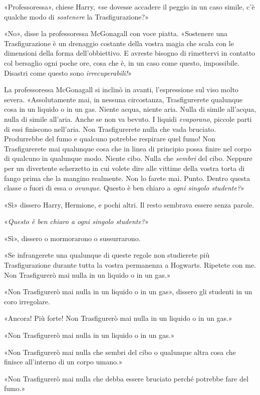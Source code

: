 «Professoressa», chiese Harry, «se dovesse accadere il peggio in un caso simile, c’è qualche modo di \textit{sostenere} la Trasfigurazione?»

«No», disse la professoressa McGonagall con voce piatta. «Sostenere una Trasfigurazione è un drenaggio costante della vostra magia che scala con le dimensioni della forma dell’obbiettivo. E avreste bisogno di rimettervi in contatto col bersaglio ogni poche ore, cosa che è, in un caso come questo, impossibile. Disastri come questo sono \textit{irrecuperabili!}»

La professoressa McGonagall si inclinò in avanti, l’espressione sul viso molto severa. «Assolutamente mai, in nessuna circostanza, Trasfigurerete qualunque cosa in un liquido o in un gas. Niente acqua, niente aria. Nulla di simile all’acqua, nulla di simile all’aria. Anche se non va bevuto. I liquidi \textit{evaporano}, piccole parti di essi finiscono nell’aria. Non Trasfigurerete nulla che vada bruciato. Produrrebbe del fumo e qualcuno potrebbe respirare quel fumo! Non Trasfigurerete mai qualunque cosa che in linea di principio possa finire nel corpo di qualcuno in qualunque modo. Niente cibo. Nulla che \textit{sembri} del cibo. Neppure per un divertente scherzetto in cui volete dire alle vittime della vostra torta di fango prima che la mangino realmente. Non lo farete mai. Punto. Dentro questa classe o fuori di essa o \textit{ovunque}. Questo è ben chiaro a \textit{ogni singolo studente?}»

«Sì» dissero Harry, Hermione, e pochi altri. Il resto sembrava essere senza parole.

«\textit{Questo è ben chiaro a ogni singolo studente?}»

«Sì», dissero o mormorarono o sussurrarono.

«Se infrangerete una qualunque di queste regole non studierete più Trasfigurazione durante tutta la vostra permanenza a Hogwarts. Ripetete con me. Non Trasfigurerò mai nulla in un liquido o in un gas.»

«Non Trasfigurerò mai nulla in un liquido o in un gas», dissero gli studenti in un coro irregolare.

«Ancora! Più forte! Non Trasfigurerò mai nulla in un liquido o in un gas.»

«Non Trasfigurerò mai nulla in un liquido o in un gas.»

«Non Trasfigurerò mai nulla che sembri del cibo o qualunque altra cosa che finisce all’interno di un corpo umano.»

«Non Trasfigurerò mai nulla che debba essere bruciato perché potrebbe fare del fumo.»

